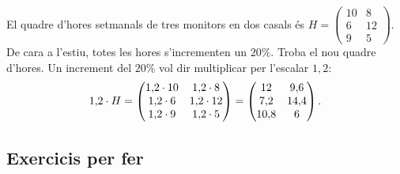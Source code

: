 \begin{exresolt}
El quadre d'hores setmanals de tres monitors en dos casals és
$H=\begin{pmatrix} 10 & 8 \\ 6 & 12 \\ 9 & 5 \end{pmatrix}$.
De cara a l'estiu, totes les hores s'incrementen un $20\%$. Troba el nou quadre d'hores.
\solucio
Un increment del $20\%$ vol dir multiplicar per l'escalar $1{,}2$:
\[
1{,}2\cdot H=\begin{pmatrix} 1{,}2\cdot 10 & 1{,}2\cdot 8 \\ 1{,}2\cdot 6 & 1{,}2\cdot 12 \\ 1{,}2\cdot 9 & 1{,}2\cdot 5 \end{pmatrix}
            =\begin{pmatrix} 12 & 9{,}6 \\ 7{,}2 & 14{,}4 \\ 10{,}8 & 6 \end{pmatrix}.
\]
\end{exresolt}

\subsection{Exercicis per fer}

